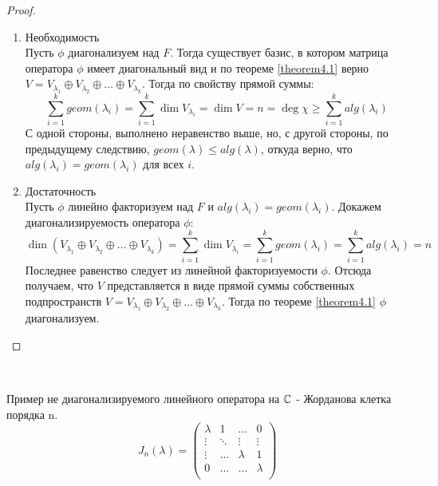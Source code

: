 \begin{proof}~
    \begin{enumerate}
        \item Необходимость \\
        Пусть $\phi$ диагонализуем над $F$. Тогда существует базис, в котором матрица оператора $\phi$ 
        имеет диагональный вид и по теореме \ref{theorem4.1} верно
        $V = V_{\lambda_1} \oplus V_{\lambda_2} \oplus \dots \oplus V_{\lambda_k}$. 
        Тогда по свойству прямой суммы: 
        $$\sum_{i=1}^k geom(\lambda_i) = \sum_{i=1}^k \dim V_{\lambda_i} = 
        \dim V = n = \deg \chi \geq \sum_{i=1}^k alg(\lambda_i)$$
        С одной стороны, выполнено неравенство выше, но, с другой стороны, по предыдущему следствию, 
        $geom(\lambda) \leq alg(\lambda)$, откуда верно, что $alg(\lambda_i) = geom(\lambda_i)$ для всех $i$.
        \item Достаточность \\
        Пусть $\phi$ линейно факторизуем над $F$ и $alg(\lambda_i) = geom(\lambda_i)$. 
        Докажем диагонализируемость оператора $\phi$:
        $$\dim(V_{\lambda_1} \oplus V_{\lambda_2} \oplus \dots \oplus V_{\lambda_k}) = 
        \sum_{i=1}^k \dim V_{\lambda_i} = \sum_{i=1}^k geom(\lambda_i) = \sum_{i=1}^k alg(\lambda_i) = n$$
        Последнее равенство следует из линейной факторизуемости $\phi$. 
        Отсюда получаем, что $V$ представляется в виде прямой суммы собственных подпространств 
        $V = V_{\lambda_1} \oplus V_{\lambda_2} \oplus \dots \oplus V_{\lambda_k}$. Тогда по теореме 
        \ref{theorem4.1} $\phi$ диагонализуем. 
    \end{enumerate}
\end{proof}

\begin{example}~

    Пример не диагонализируемого линейного оператора на $\mathbb{C}$ - Жорданова клетка порядка n.
    \begin{equation*}
    J_n(\lambda) =
        \left(
            \begin{array}{cccc}
            \lambda & 1 & \dots & 0 \\
            \vdots & \ddots & \vdots & \vdots \\
            \vdots & \dots & \lambda & 1 \\
            0 & \dots & \dots & \lambda \\
            \end{array}
        \right)
    \end{equation*}
\end{example}

